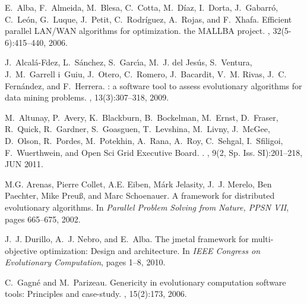 \documentclass{sig-alternate}
\begin{document}
%


\begin{thebibliography}{10}

E.~Alba, F.~Almeida, M.~Blesa, C.~Cotta, M.~D{\'i}az, I.~Dorta, J.~Gabarr{\'o},
  C.~Le{\'o}n, G.~Luque, J.~Petit, C.~Rodr{\'i}guez, A.~Rojas, and F.~Xhafa.
\newblock Efficient parallel {LAN/WAN} algorithms for optimization. the
  {MALLBA} project.
, 32(5-6):415--440, 2006.

J.~Alcal{\'a}-Fdez, L.~S{\'a}nchez, S.~Garc\'{\i}a, M.~J. del Jes{\'u}s,
  S.~Ventura, J.~M.~Garrell i~Guiu, J.~Otero, C.~Romero, J.~Bacardit, V.~M.
  Rivas, J.~C. Fern{\'a}ndez, and F.~Herrera.
: a software tool to assess evolutionary algorithms for data
  mining problems.
, 13(3):307--318, 2009.

M.~Altunay, P.~Avery, K.~Blackburn, B.~Bockelman, M.~Ernst, D.~Fraser,
  R.~Quick, R.~Gardner, S.~Goasguen, T.~Levshina, M.~Livny, J.~McGee, D.~Olson,
  R.~Pordes, M.~Potekhin, A.~Rana, A.~Roy, C.~Sehgal, I.~Sfiligoi,
  F.~Wuerthwein, and {Open Sci Grid Executive Board}.
.
, {9}({2, Sp. Iss. SI}):{201--218},
  {JUN} {2011}.

M.G. Arenas, Pierre Collet, A.E. Eiben, M\'ark Jelasity, J.~J. Merelo, Ben
  Paechter, Mike Preu\ss, and Marc Schoenauer.
\newblock A framework for distributed evolutionary algorithms.
\newblock In {\em Parallel Problem Solving from Nature, PPSN VII}, pages
  665--675, 2002.

J.~J. Durillo, A.~J. Nebro, and E.~Alba.
\newblock The jmetal framework for multi-objective optimization: Design and
  architecture.
\newblock In {\em IEEE Congress on Evolutionary Computation}, pages 1--8, 2010.

C.~Gagn{\'e} and M.~Parizeau.
\newblock Genericity in evolutionary computation software tools: Principles and
  case-study.
,
  15(2):173, 2006.


\end{thebibliography}
\end{document}
